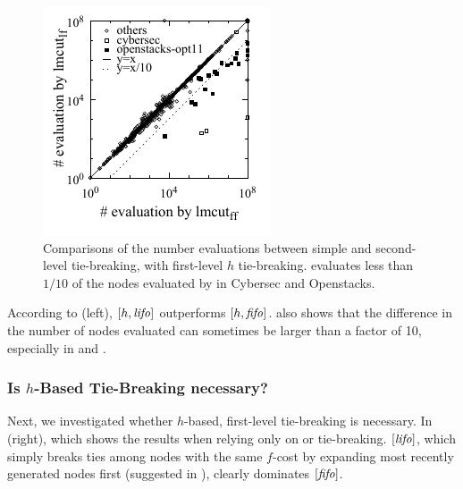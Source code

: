 \begin{figure}[tb]
 \centering {}
 \includegraphics{tables/aaai16-30min-5min-cut/aaai16prelim3/evaluated-lmcut_ff-lmcut_lf.pdf}
 \caption{Comparisons of the number evaluations between simple \lifo and
 \fifo second-level tie-breaking, with first-level $h$
 tie-breaking. \lifo evaluates less than $1/10$ of the nodes evaluated
 by \fifo in Cybersec and Openstacks.}
 \label{f-h-eval}
\end{figure}

According to  (left),
$[h,\mbox{\textit{lifo}}]$ outperforms $[h,\mbox{\textit{fifo}}]$.
 also shows that the difference in the number of nodes
evaluated can sometimes be larger than a factor of 10, especially in
 and .

\subsubsection{Is $h$-Based Tie-Breaking necessary?}
\label{sec:h-necessary}
Next, we investigated whether $h$-based, first-level tie-breaking is necessary.
In  (right), which shows the results when  relying only on \fifo or \lifo tie-breaking.
$[\mbox{\textit{lifo}}]$, which simply breaks ties among nodes with the same $f$-cost by expanding most recently generated nodes first (suggested in \cite{korf1985depth}), clearly dominates $[\mbox{\textit{fifo}}]$.

